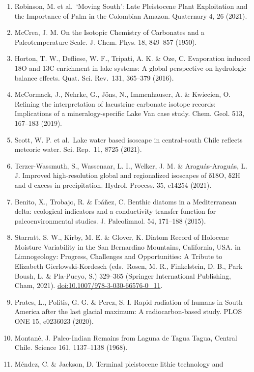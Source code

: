 \documentclass[
]{article}
\begin{document}
\begin{enumerate}
  Evol. 8, 705--716 (2024).
\item
  Robinson, M. et al.~`Moving South': Late Pleistocene Plant
  Exploitation and the Importance of Palm in the Colombian Amazon.
  Quaternary 4, 26 (2021).
\item
  McCrea, J. M. On the Isotopic Chemistry of Carbonates and a
  Paleotemperature Scale. J. Chem. Phys. 18, 849--857 (1950).
\item
  Horton, T. W., Defliese, W. F., Tripati, A. K. \& Oze, C. Evaporation
  induced 18O and 13C enrichment in lake systems: A global perspective
  on hydrologic balance effects. Quat. Sci. Rev.~131, 365--379 (2016).
\item
  McCormack, J., Nehrke, G., Jöns, N., Immenhauser, A. \& Kwiecien, O.
  Refining the interpretation of lacustrine carbonate isotope records:
  Implications of a mineralogy-specific Lake Van case study. Chem. Geol.
  513, 167--183 (2019).
\item
  Scott, W. P. et al.~Lake water based isoscape in central-south Chile
  reflects meteoric water. Sci. Rep.~11, 8725 (2021).
\item
  Terzer-Wassmuth, S., Wassenaar, L. I., Welker, J. M. \&
  Araguás-Araguás, L. J. Improved high-resolution global and
  regionalized isoscapes of δ18O, δ2H and d-excess in precipitation.
  Hydrol. Process. 35, e14254 (2021).
\item
  Benito, X., Trobajo, R. \& Ibáñez, C. Benthic diatoms in a
  Mediterranean delta: ecological indicators and a conductivity transfer
  function for paleoenvironmental studies. J. Paleolimnol. 54, 171--188
  (2015).
\item
  Starratt, S. W., Kirby, M. E. \& Glover, K. Diatom Record of Holocene
  Moisture Variability in the San Bernardino Mountains, California, USA.
  in Limnogeology: Progress, Challenges and Opportunities: A Tribute to
  Elizabeth Gierlowski-Kordesch (eds.~Rosen, M. R., Finkelstein, D. B.,
  Park Boush, L. \& Pla-Pueyo, S.) 329--365 (Springer International
  Publishing, Cham, 2021). \url{doi:10.1007/978-3-030-66576-0_11}.
\item
  Prates, L., Politis, G. G. \& Perez, S. I. Rapid radiation of humans
  in South America after the last glacial maximum: A radiocarbon-based
  study. PLOS ONE 15, e0236023 (2020).
\item
  Montané, J. Paleo-Indian Remains from Laguna de Tagua Tagua, Central
  Chile. Science 161, 1137--1138 (1968).
\item
  Méndez, C. \& Jackson, D. Terminal pleistocene lithic technology and

\end{enumerate}
\end{document}
